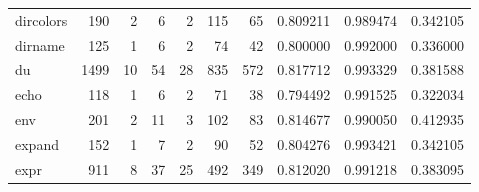 \begin{longtable}{lrrrrrrrrr}
dircolors &                    190 &                                  2 &                                 6 &                                2 &                               115 &                              65 &                                0.809211 &                               0.989474 &                             0.342105 \\
dirname   &                    125 &                                  1 &                                 6 &                                2 &                                74 &                              42 &                                0.800000 &                               0.992000 &                             0.336000 \\
du        &                   1499 &                                 10 &                                54 &                               28 &                               835 &                             572 &                                0.817712 &                               0.993329 &                             0.381588 \\
echo      &                    118 &                                  1 &                                 6 &                                2 &                                71 &                              38 &                                0.794492 &                               0.991525 &                             0.322034 \\
env       &                    201 &                                  2 &                                11 &                                3 &                               102 &                              83 &                                0.814677 &                               0.990050 &                             0.412935 \\
expand    &                    152 &                                  1 &                                 7 &                                2 &                                90 &                              52 &                                0.804276 &                               0.993421 &                             0.342105 \\
expr      &                    911 &                                  8 &                                37 &                               25 &                               492 &                             349 &                                0.812020 &                               0.991218 &                             0.383095 \\

\end{longtable}

